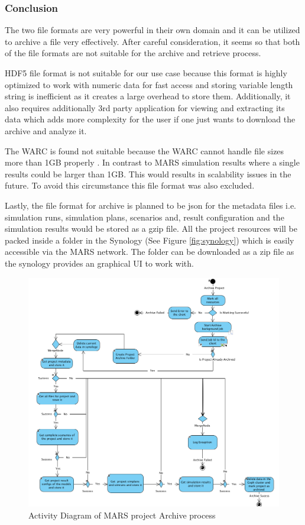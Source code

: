 \subsubsection{Conclusion}
    The two file formats are very powerful in their own domain and it can be utilized to archive a file very effectively. After careful consideration,  
    it seems so that both of the file formats are not suitable for the archive and retrieve process. 

    HDF5 file format is not suitable for our use case because this format is highly optimized to work with
    numeric data for fast access and storing variable length string is inefficient as it creates a large overhead to store them. 
    Additionally, it also requires additionally 3rd party application for viewing and extracting its data which 
    adds more complexity for the user if one just wants to download the archive and analyze it. 

    The WARC is found not suitable because the WARC cannot handle file sizes more than 1GB properly \cite[Appendix B]{WARC}. 
    In contrast to MARS simulation results where a single results could be larger than 1GB. This would results in scalability issues in the future. To 
    avoid this circumstance this file format was also excluded.

    Lastly, the file format for archive is planned to be json for the metadata files i.e. simulation runs, simulation plans, scenarios and, result configuration and 
    the simulation results would be stored as a gzip file. All the project resources will be packed inside a folder in the Synology (See Figure \ref{fig:synology})
     which is easily accessible via the MARS network.
    The folder can be downloaded as a zip file as the synology provides an graphical UI to work with.   

\begin{figure}[H]
    \centering \includegraphics[scale=0.45]{grafiken/archiveActivity.png}
    \caption{Activity Diagram of MARS project Archive process}
    \label{fig:archiveActivity}
\end{figure}

